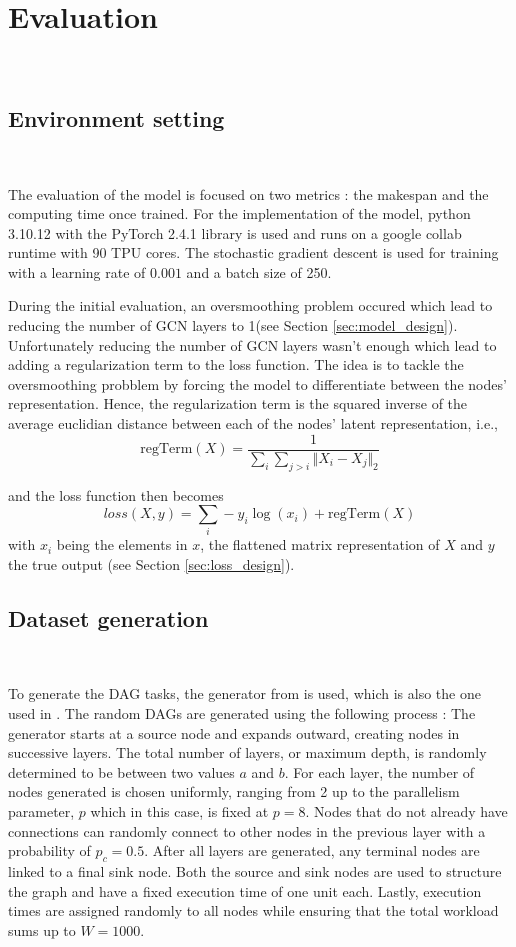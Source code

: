 \section{Evaluation}
~

\subsection{Environment setting}
~

The evaluation of the model is focused on two metrics : the makespan and the computing time once trained.
For the implementation of the model, python 3.10.12 with the PyTorch 2.4.1 library is used and runs on a google collab runtime
with 90 TPU cores.
The stochastic gradient descent is used for training with a learning rate of $0.001$ and a batch size of 250.

During the initial evaluation, an oversmoothing problem occured which lead to reducing the number of GCN layers to 1(see Section \ref{sec:model_design}).
Unfortunately reducing the number of GCN layers wasn't enough which lead 
to adding a regularization term to the loss function.
The idea is to tackle the oversmoothing probblem by forcing the model
to differentiate between the nodes' representation.
Hence, the regularization term is the squared inverse of the average euclidian distance 
between each of the nodes' latent representation, i.e., 
\begin{equation}
    \text{regTerm}(X) = \frac{1}{\sum_{i}\sum_{j > i} \Vert X_i - X_j\Vert_{2} }
\end{equation}
    
and the loss function then becomes
\begin{equation}
    loss(X, y) = \sum_{i} -y_i\log(x_i) + \text{regTerm}(X)
\end{equation}
with $x_i$ being the elements in $x$, the flattened matrix representation of $X$
and $y$ the true output (see Section \ref{sec:loss_design}).

\subsection{Dataset generation}
~

To generate the DAG tasks, the generator from \citet{zhao2020DAGsched} is used, which is also the one used in \citet{Lee2021GlobalDagSchedDRL}.
The random DAGs are generated using the following process :
The generator starts at a source node and expands outward, 
creating nodes in successive layers. The total number of layers, 
or maximum depth, is randomly determined to be between two values $a$ and $b$.
For each layer, the number of nodes generated is chosen uniformly, 
ranging from 2 up to the parallelism parameter, $p$ which in this case, 
is fixed at $p=8$. Nodes that do 
not already have connections can randomly connect to other nodes in 
the previous layer with a probability of $p_c=0.5$. After all layers 
are generated, any terminal nodes are linked to a final sink node. 
Both the source and sink nodes are used to structure the graph and 
have a fixed execution time of one unit each. Lastly, 
execution times are assigned randomly to all nodes while ensuring 
that the total workload sums up to $W = 1000$\cite{zhao2020DAGsched}.

